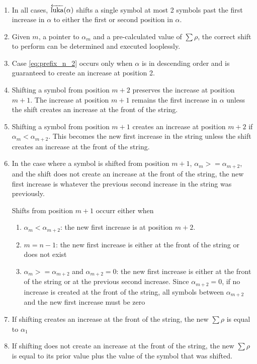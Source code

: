 \begin{enumerate}
    \item In all cases, $\overleftarrow{\text{luka}}(\alpha)$ shifts a single symbol at most 2 symbols past the first increase in $\alpha$ to either the first or second position in $\alpha$.  
    \item Given $m$, a pointer to $\alpha_m$ and a pre-calculated value of $\sum{\rho}$, the correct shift to perform can be determined and executed looplessly.
    \item Case \ref{eq:prefix_n_2} occurs only when $\alpha$ is in descending order and is guaranteed to create an increase at position 2.

    \item Shifting a symbol from position $m+2$ preserves the increase at position $m+1$.  The increase at position $m+1$ remains the first increase in $\alpha$ unless the shift creates an increase at the front of the string.

    \item Shifting a symbol from position $m+1$ creates an increase at position $m+2$ if $\alpha_m < \alpha_{m+2}$.  This becomes the new first increase in the string unless the shift creates an increase at the front of the string.

    \item In the case where a symbol is shifted from position $m+1$, $\alpha_m >= \alpha_{m+2}$, and the shift does not create an increase at the front of the string, the new first increase is whatever the previous second increase in the string was previously. \

Shifts from position $m+1$ occurr either when 
        \begin{enumerate}
            \item $\alpha_m < \alpha_{m+2}$: the new first increase is at position $m+2$.
            \item $m=n-1$: the new first increase is either at the front of the string or does not exist
	    \item $\alpha_m >= \alpha_{m+2}$ and $\alpha_{m+2} = 0$: the new first increase is either at the front of the string or at the previous second increase.  Since $\alpha_{m+2}=0$, if no increase is created at the front of the string, all symbols between $\alpha_{m+2}$ and the new first increase must be zero \label{reasonforstack}
        \end{enumerate}
    \item If shifting creates an increase at the front of the string, the new $\sum{\rho}$ is equal to $\alpha_1$
    \item If shifting does not create an increase at the front of the string, the new $\sum{\rho}$ is equal to its prior value plus the value of the symbol that was shifted.
         
\end{enumerate}

